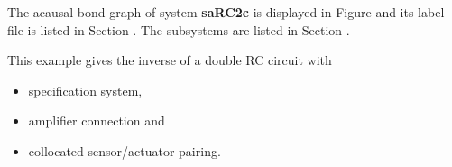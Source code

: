 

   The acausal bond graph of system \textbf{saRC2c} is
   displayed in Figure  and its label
   file is listed in Section .
   The subsystems are listed in Section .

This example gives the inverse of a double RC circuit with
\begin{itemize}
\item specification system,
\item amplifier connection and
\item collocated sensor/actuator pairing.
\end{itemize}


